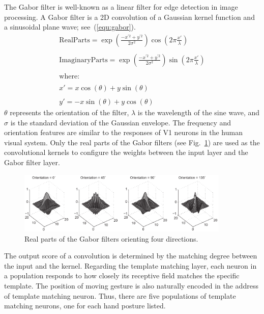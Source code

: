 The Gabor filter is well-known as a linear filter for edge detection in image processing. 
A Gabor filter is a 2D convolution of a Gaussian kernel function and a sinusoidal plane wave; see~(\ref{equ:gabor}). 
\begin{equation}
\begin{array}{l}
\mathrm{Real Parts} = \exp \left(\frac{-x^{'2}+y^{'2}}{2\sigma ^{2}}\right)\cos \left(2\pi\frac{{x}'}{\lambda }\right)
\\
\\
\mathrm{Imaginary Parts} = \exp \left(\frac{-x^{'2}+y^{'2}}{2\sigma ^{2}}\right)\sin \left(2\pi\frac{{x}'}{\lambda }\right)
\\
\\
\mathrm{where:}
\\
\\
{x}'=x\cos (\theta ) + y\sin (\theta)
\\
\\
{y}'=-x\sin (\theta ) + y\cos (\theta)
\end{array}
\label{equ:gabor}
\end{equation}
$\theta$ represents the orientation of the filter, $\lambda$ is the wavelength of the sine wave, and $\sigma$ is the standard deviation of the Gaussian envelope. 
The frequency and orientation features are similar to the responses of V1 neurons in the human visual system. 
Only the real parts of the Gabor filters (see Fig.~\ref{fig:gabor}) are used as the convolutional kernels to configure the weights between the input layer and the Gabor filter layer.

\begin{figure}
\centering
	\includegraphics[width=0.9\textwidth]{pics_icann/gabor.pdf}
	\caption{Real parts of the Gabor filters orienting four directions.}
	\label{fig:gabor}
\end{figure}

The output score of a convolution is determined by the matching degree between the input and the kernel.
Regarding the template matching layer, each neuron in a population responds to how closely its receptive field matches the specific template.
The position of moving gesture is also naturally encoded in the address of template matching neuron.
Thus, there are five populations of template matching neurons, one for each hand posture listed.

